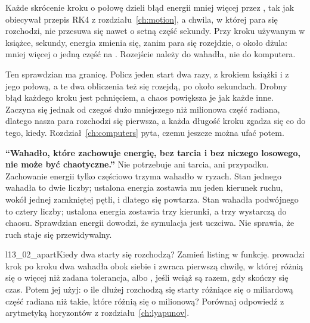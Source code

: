 

\noindent
Każde skrócenie kroku o połowę dzieli błąd energii mniej więcej przez
, tak jak obiecywał przepis RK4 z
rozdziału~\ref{ch:motion}, a chwila, w której para się rozchodzi, nie
przesuwa się nawet o setną część sekundy. Przy kroku używanym w książce,
 sekundy, energia zmienia się, zanim para się rozejdzie, o około
 dżula: mniej więcej o jedną część na
. Rozejście należy do wahadła, nie do komputera.


\begin{note}
Ten sprawdzian ma granicę. Policz jeden start dwa razy, z krokiem
książki i z jego połową, a te dwa obliczenia też się rozejdą, po około
 sekundach. Drobny błąd każdego kroku jest
pchnięciem, a chaos powiększa je jak każde inne. Zaczyna się jednak od czegoś
dużo mniejszego niż milionowa część radiana, dlatego nasza para rozchodzi się
pierwsza, a każda długość kroku zgadza się co do tego, kiedy.
Rozdział~\ref{ch:computers} pyta, czemu jeszcze można ufać potem.
\end{note}

\begin{trapbox}
\textbf{\enquote{Wahadło, które zachowuje energię, bez tarcia i bez niczego
losowego, nie może być chaotyczne.}} Nie potrzebuje ani tarcia, ani
przypadku. Zachowanie energii tylko częściowo trzyma wahadło w ryzach. Stan
jednego wahadła to dwie liczby; ustalona energia zostawia mu jeden kierunek
ruchu, wokół jednej zamkniętej pętli, i dlatego się powtarza. Stan wahadła
podwójnego to cztery liczby; ustalona energia zostawia trzy kierunki, a trzy
wystarczą do chaosu. Sprawdzian energii dowodzi, że symulacja jest uczciwa.
Nie sprawia, że ruch staje się przewidywalny.
\end{trapbox}

\begin{lab}{l13_02_apart}{Kiedy dwa starty się rozchodzą?}
Zamień listing w funkcję.  prowadzi krok po kroku
dwa wahadła obok siebie i zwraca pierwszą chwilę, w której różnią się o
więcej niż zadana tolerancja, albo , jeśli wciąż są razem, gdy
skończy się czas. Potem jej użyj: o ile dłużej rozchodzą się starty
różniące się o miliardową część radiana niż takie, które różnią się o
milionową? Porównaj odpowiedź z arytmetyką horyzontów z
rozdziału~\ref{ch:lyapunov}.
\end{lab}


